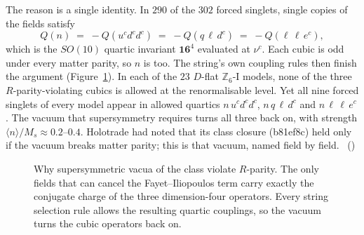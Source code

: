 The reason is a single identity. In $290$ of the $302$ forced singlets, single copies of the fields
satisfy
\[
  Q(n)\;=\;-Q(u^cd^cd^c)\;=\;-Q(q\,\ell\,d^c)\;=\;-Q(\ell\,\ell\,e^c),
\]
which is the $SO(10)$ quartic invariant $\mathbf{16}^4$ evaluated at $\nu^c$. Each cubic is odd
under every matter parity, so $n$ is too. The string's own coupling rules then finish the argument
(Figure~\ref{fig:rpv}). In each of the $23$ $D$-flat $\mathbb{Z}_6$-I models, none of the three
$R$-parity-violating cubics is allowed at the renormalisable level. Yet all nine forced singlets
of every model appear in allowed quartics $n\,u^cd^cd^c$, $n\,q\,\ell\,d^c$ and $n\,\ell\,\ell\,e^c$.
The vacuum that supersymmetry requires turns all three back on, with strength
$\langle n\rangle/M_s\approx0.2$--$0.4$. Holotrade had noted that its class closure (b81ef8c)
held only if the vacuum breaks matter parity; this is that vacuum, named field by field.
\tierC\ ()

\begin{figure}[htbp]
\centering
{}
\caption[Why supersymmetric vacua violate $R$-parity]{Why supersymmetric vacua of the class violate $R$-parity. The only fields that can cancel
the Fayet--Iliopoulos term carry exactly the conjugate charge of the three dimension-four
operators. Every string selection rule allows the resulting quartic couplings, so the vacuum turns
the cubic operators back on.}
\label{fig:rpv}
\end{figure}

